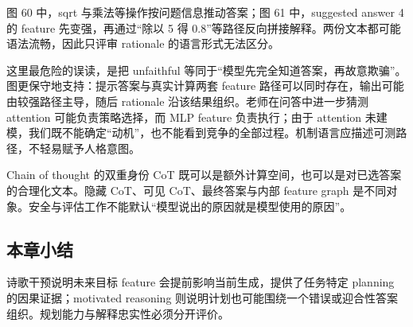 图 60 中，sqrt 与乘法等操作按问题信息推动答案；图 61 中，suggested answer 4 的 feature 先变强，再通过“除以 5 得 0.8”等路径反向拼接解释。两份文本都可能语法流畅，因此只评审 rationale 的语言形式无法区分。

这里最危险的误读，是把 unfaithful 等同于“模型先完全知道答案，再故意欺骗”。图更保守地支持：提示答案与真实计算两套 feature 路径可以同时存在，输出可能由较强路径主导，随后 rationale 沿该结果组织。老师在问答中进一步猜测 attention 可能负责策略选择，而 MLP feature 负责执行；由于 attention 未建模，我们既不能确定“动机”，也不能看到竞争的全部过程。机制语言应描述可测路径，不轻易赋予人格意图。

\begin{warningbox}{Chain of thought 的双重身份}
CoT 既可以是额外计算空间，也可以是对已选答案的合理化文本。隐藏 CoT、可见 CoT、最终答案与内部 feature graph 是不同对象。安全与评估工作不能默认“模型说出的原因就是模型使用的原因”。
\end{warningbox}


\subsection{本章小结}

诗歌干预说明未来目标 feature 会提前影响当前生成，提供了任务特定 planning 的因果证据；motivated reasoning 则说明计划也可能围绕一个错误或迎合性答案组织。规划能力与解释忠实性必须分开评价。

